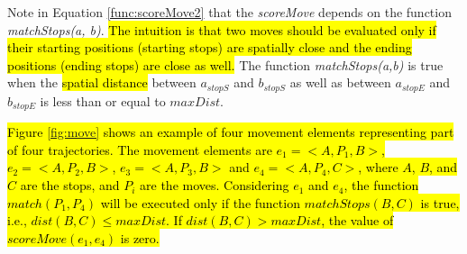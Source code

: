 \documentclass[12pt]{article}
\begin{document}
Note in Equation \ref{func:scoreMove2} that the \emph{scoreMove} depends on the function \textit{matchStops(a, b)}. \hl{The intuition is that two moves should be evaluated only if their starting positions (starting stops) are spatially close and the ending positions (ending stops) are close as well.}
The function \emph{matchStops(a,b)} is true when the \hl{spatial distance} between $a_{stopS}$ and $b_{stopS}$  as well as between $a_{stopE}$ and $b_{stopE}$ is less than or equal to $maxDist$.
    

\hl{Figure {\ref{fig:move}} shows an example of four movement elements representing part of four trajectories. The movement elements are $e_1=<A, P_1, B>$, $e_2=<A, P_2, B>$, $e_3=<A, P_3, B>$ and $e_4=<A, P_4, C>$, where $A$, $B$, and $C$ are the stops, and $P_i$ are the moves. Considering $e_1$ and $e_4$, the function $match(P_1,P_4)$ will be executed only if the function $matchStops(B,C)$ is true, i.e., $dist(B,C) \leq  maxDist$. If $dist(B,C) > maxDist$, the value of $scoreMove(e_1,e_4)$ is zero.
}


\end{document}
